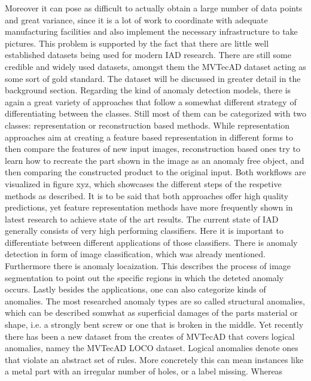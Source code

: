 Moreover it can pose as difficult to actually obtain a large number of data points and great variance, since it is a lot of work to 
coordinate with adequate manufacturing facilities and also implement the necessary infrastructure to take pictures. This problem is supported 
by the fact that there are little well established datasets being used for modern IAD research. There are still some credible and widely used 
datasets, amongst them the MVTecAD \cite{MVTEC_Bergmann_2021} dataset acting as some sort of gold standard. The dataset will be discussed in greater detail 
in the background section. Regarding the kind of anomaly detection models, there is again a great variety of approaches that follow a 
somewhat different strategy of differentiating between the classes. Still most of them can be categorized with two classes: representation 
or reconstruction based methods. While representation approaches aim at creating a feature based representation in different forms to then 
compare the features of new input images, reconstruction based ones try to learn how to recreate the part shown in the image as an anomaly 
free object, and then comparing the constructed product to the original input. Both workflows are visualized in figure xyz, which showcases 
the different steps of the respetive methods as described. It is to be said that both approaches offer high quality predictions, yet 
feature representation methods have more frequently shown in latest research to achieve state of the art results.
\newline
The current state of IAD generally consists of very high performing classifiers. Here it is important to differentiate between different 
applications of those classifiers. There is anomaly detection in form of image classification, which was already mentioned. 
Furthermore there is anomaly locaization. This describes the process of image segmentation to point out the specific regions in which 
the deteted anomaly occurs. Lastly besides the applications, one can also categorize kinds of anomalies. The most researched anomaly types 
are so called structural anomalies, which can be described somwhat as superficial damages of the parts material or shape, i.e. a strongly 
bent screw or one that is broken in the middle. Yet recently there has been a new dataset from the creates of MVTecAD that covers logical 
anomalies, namey the MVTecAD LOCO \cite{LOCODentsAndScratchesBergmann2022} dataset. Logical anomalies denote ones that violate an abstract 
set of rules. More concretely this can mean instances like a metal part with an irregular number of holes, or a label missing. Whereas 
